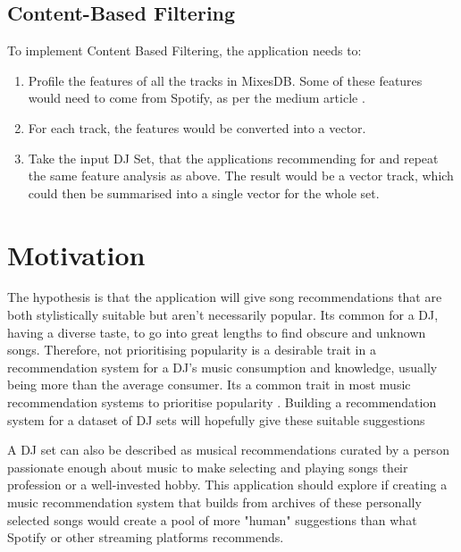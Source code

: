 \documentclass[11pt,titlepage,oneside]{book}
\begin{document}
  \subsection{Content-Based Filtering}
  To implement Content Based Filtering, the application needs to:
 \begin{enumerate}
 	
 	\item  Profile the features of all the tracks in MixesDB. Some of these features would need to come from Spotify, as per the medium article \citep{chow_music_2020}.
 	
 	\item For each track, the features would be converted into a vector.
 	
 	\item Take the input DJ Set, that the applications recommending for and repeat the same feature analysis as above. The result would be a vector track, which could then be summarised into a single vector for the whole set.
 	
 \end{enumerate}

\section{Motivation}

	The hypothesis is that the application will give song recommendations that are both stylistically suitable but aren't necessarily popular. Its common for a DJ, having a diverse taste, to go into great lengths to find obscure and unknown songs. Therefore, not prioritising popularity is a desirable trait in a recommendation system for a DJ's music consumption and knowledge, usually being more than the average consumer.  Its a common trait in most music recommendation systems to prioritise popularity \citep{lesota_analyzing_2021}. Building a recommendation system for a dataset of DJ sets will hopefully give these suitable suggestions 
	
	\begin{flushleft}
		
		A DJ set can also be described as musical recommendations curated by a person passionate enough about music to make selecting and playing songs their profession or a well-invested hobby. This application should explore if creating a music recommendation system that builds from archives of these personally selected songs would create a pool of more "human" suggestions than what Spotify or other streaming platforms recommends.
		
	\end{flushleft}
	
\end{document}
